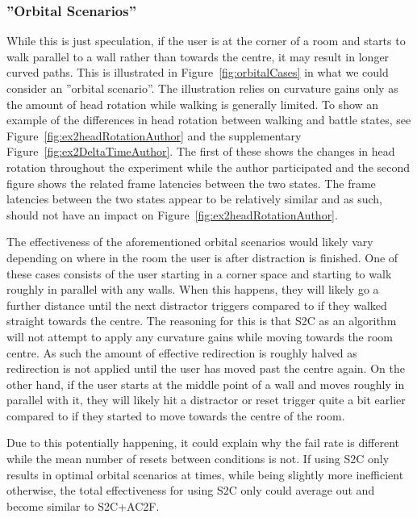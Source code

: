 \subsubsection{''Orbital Scenarios''}
While this is just speculation, if the user is at the corner of a room and starts to walk parallel to a wall rather than towards the centre, it may result in longer curved paths. This is illustrated in Figure~\ref{fig:orbitalCases} in what we could consider an ''orbital scenario''. The illustration relies on curvature gains only as the amount of head rotation while walking is generally limited. To show an example of the differences in head rotation between walking and battle states, see Figure~\ref{fig:ex2headRotationAuthor} and the supplementary Figure~\ref{fig:ex2DeltaTimeAuthor}. The first of these shows the changes in head rotation throughout the experiment while the author participated and the second figure shows the related frame latencies between the two states. The frame latencies between the two states appear to be relatively similar and as such, should not have an impact on Figure~\ref{fig:ex2headRotationAuthor}.

The effectiveness of the aforementioned orbital scenarios would likely vary depending on where in the room the user is after distraction is finished. One of these cases consists of the user starting in a corner space and starting to walk roughly in parallel with any walls. When this happens, they will likely go a further distance until the next distractor triggers compared to if they walked straight towards the centre. The reasoning for this is that S2C as an algorithm will not attempt to apply any curvature gains while moving towards the room centre. As such the amount of effective redirection is roughly halved as redirection is not applied until the user has moved past the centre again. On the other hand, if the user starts at the middle point of a wall and moves roughly in parallel with it, they will likely hit a distractor or reset trigger quite a bit earlier compared to if they started to move towards the centre of the room.  

Due to this potentially happening, it could explain why the fail rate is different while the mean number of resets between conditions is not. If using S2C only results in optimal orbital scenarios at times, while being slightly more inefficient otherwise, the total effectiveness for using S2C only could average out and become similar to S2C+AC2F.

